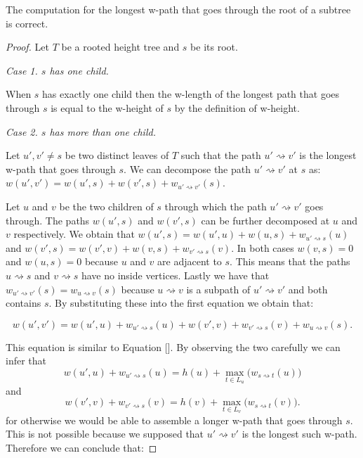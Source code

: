 \begin{lem} The computation for the longest w-path that goes through the root of a subtree is correct. \end{lem}
\begin{proof}

   Let $T$ be a rooted height tree and $s$ be its root.

   \em Case 1. $s$ has one child. \em

   When $s$ has exactly one child then the w-length of the longest path that goes through $s$ is equal to the w-height of $s$ by the definition of w-height.

   \em Case 2. $s$ has more than one child. \em

   Let $u', v' \ne s$ be two distinct leaves of $T$ such that the path $u' \rightsquigarrow v'$ is the longest w-path that goes through $s$.
   We can decompose the path $u' \rightsquigarrow v'$ at $s$ as: $w(u', v') = w(u', s) + w(v', s) + w_{u' \rightsquigarrow v'}(s)$.

   Let $u$ and $v$ be the two children of $s$ through which the path $u' \rightsquigarrow v'$ goes through.
   The paths $w(u', s)$ and $w(v', s)$ can be further decomposed at $u$ and $v$ respectively. We obtain that
   $w(u', s) = w(u', u) + w(u, s) + w_{u' \rightsquigarrow s}(u)$ and
   $w(v', s) = w(v', v) + w(v, s) + w_{v' \rightsquigarrow s}(v)$.
   In both cases $w(v, s) = 0$ and $w(u, s) = 0$ because $u$ and $v$ are adjacent to $s$. This means that the paths $u \rightsquigarrow s$ and $v \rightsquigarrow s$ have no inside vertices.
   Lastly we have that $w_{u' \rightsquigarrow v'}(s) = w_{u \rightsquigarrow v}(s)$ because $u \rightsquigarrow v$ is a subpath of $u' \rightsquigarrow v'$ and both contains $s$.
   By substituting these into the first equation we obtain that:

   $$w(u', v') = w(u', u) + w_{u' \rightsquigarrow s}(u) + w(v', v) + w_{v' \rightsquigarrow s}(v) + w_{u \rightsquigarrow v}(s). $$

   This equation is similar to Equation []. By observing the two carefully we can infer that
   $$w(u', u) + w_{u' \rightsquigarrow s}(u) = h(u) + \max\limits_{t \in L_u}\Big(w_{s \rightsquigarrow t}(u)\Big)$$
   and
   $$w(v', v) + w_{v' \rightsquigarrow s}(v) = h(v) + \max\limits_{t \in L_v}\Big(w_{s \rightsquigarrow t}(v)\Big).$$
   for otherwise we would be able to assemble a longer w-path that goes through $s$. This is not possible because we supposed that $u' \rightsquigarrow v'$ is the longest such w-path. Therefore we can conclude that:


\end{proof}
